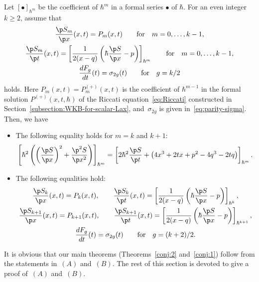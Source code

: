 \begin{thm} \label{thm:induction-scheme}
Let $[\bullet]_{\hbar^{m}}$ be the coefficient of
$\hbar^{m}$ in a formal series $\bullet$ of $\hbar$.
For an even integer $k \ge 2$, assume that
\begin{gather}
\frac{\p S_{m}}{\p x}(x,t) = P_{m}(x,t)\qquad
\text{for} \quad m=0,\dots,k-1, \nonumber\\
\frac{\p S_{m}}{\p t}(x,t) = \left[ \frac{1}{2(x-q)}\left(
\hbar \frac{\p S}{\p x} - p \right) \right]_{\hbar^{m}} \qquad
\text{for} \quad m=0,\dots,k-1, \nonumber\\
\frac{d F_{g}}{d t}(t) = \sigma_{2g}(t)  \qquad
\text{for} \quad g = k/2
\label{eq:assume-A-1}
\end{gather}
holds. Here $P_{m}(x,t) = P^{(+)}_{m}(x,t)$
is the coefficient of $\hbar^{m-1}$ in the formal solution
$P^{(+)}(x,t,\hbar)$ of the Riccati equation~\eqref{eq:Riccati}
constructed in Section~{\rm \ref{subsection:WKB-for-scalar-Lax}},
and~$\sigma_{2g}$ is given in~\eqref{eq:parity-sigma}.
Then, we have
\begin{itemize}\itemsep=0pt
\item[$(A)$] %
The following equality holds for $m = k$ and $k+1$:
\begin{gather}
\label{eq:claim-A-1}
\left[
\hbar^{2}\left( \left(\frac{\p S}{\p x}\right)^{2} +
\frac{\p^{2} S}{\p x^{2}} \right)
\right]_{\hbar^{m}}
 =  \left[ 2\hbar^{2} \frac{\p S}{\p t} +
\big(4x^{3}+2t x + p^{2} - 4q^{3}-2tq\big) \right]_{\hbar^{m}}.
\end{gather}

\item[$(B)$]
The following equalities hold:
\begin{gather}
\label{eq:claim-A-3}
\frac{\p S_{k}}{\p x}(x,t)   =   P_{k}(x,t), \qquad
\frac{\p S_{k}}{\p t}(x,t) = \left[ \frac{1}{2(x-q)}\left(
\hbar \frac{\p S}{\p x} - p \right) \right]_{\hbar^{k}}, \\
\frac{\p S_{k+1}}{\p x}(x,t)   =   P_{k+1}(x,t), \qquad
\frac{\p S_{k+1}}{\p t}(x,t) = \left[ \frac{1}{2(x-q)}\left(
\hbar \frac{\p S}{\p x} - p \right) \right]_{\hbar^{k+1}}, \label{eq:claim-B-3}
\\
\label{eq:claim-B-4}
\frac{dF_{g}}{dt}(t)   =    \sigma_{2g}(t)
\qquad \text{for} \quad g=(k+2)/2.
\end{gather}
\end{itemize}
\end{thm}

It is obvious that our main theorems (Theorems~\ref{conj:2} and~\ref{conj:1})
follow from the statements
in~$(A)$ and~$(B)$. The rest of this section is devoted to
give a proof of~$(A)$ and~$(B)$.


